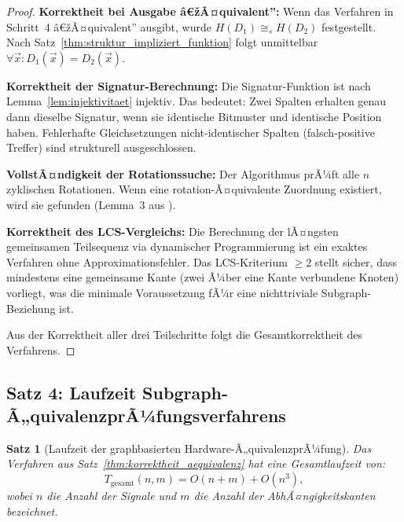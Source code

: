 ﻿\documentclass[12pt,a4paper]{report}
\newtheorem{theorem}{Satz}[section]
\begin{document}
\begin{proof}
\textbf{Korrektheit bei Ausgabe â€žÃ¤quivalent'':} Wenn das Verfahren in Schritt~4 â€žÃ¤quivalent'' ausgibt, wurde $H(D_1) \cong_s H(D_2)$ festgestellt. Nach Satz~\ref{thm:struktur_impliziert_funktion} folgt unmittelbar $\forall \vec{x} : D_1(\vec{x}) = D_2(\vec{x})$.

\textbf{Korrektheit der Signatur-Berechnung:} Die Signatur-Funktion ist nach Lemma~\ref{lem:injektivitaet} injektiv. Das bedeutet: Zwei Spalten erhalten genau dann dieselbe Signatur, wenn sie identische Bitmuster und identische Position haben. Fehlerhafte Gleichsetzungen nicht-identischer Spalten (falsch-positive Treffer) sind strukturell ausgeschlossen.

\textbf{VollstÃ¤ndigkeit der Rotationssuche:} Der Algorithmus prÃ¼ft alle $n$ zyklischen Rotationen. Wenn eine rotation-Ã¤quivalente Zuordnung existiert, wird sie gefunden (Lemma~3 aus \cite{subgraph2026}).

\textbf{Korrektheit des LCS-Vergleichs:} Die Berechnung der lÃ¤ngsten gemeinsamen Teilsequenz via dynamischer Programmierung ist ein exaktes Verfahren ohne Approximationsfehler. Das LCS-Kriterium $\geq 2$ stellt sicher, dass mindestens eine gemeinsame Kante (zwei Ã¼ber eine Kante verbundene Knoten) vorliegt, was die minimale Voraussetzung fÃ¼r eine nichttriviale Subgraph-Beziehung ist.

Aus der Korrektheit aller drei Teilschritte folgt die Gesamtkorrektheit des Verfahrens.
\end{proof}

\subsection{Satz 4: Laufzeit Subgraph-Ã„quivalenzprÃ¼fungsverfahrens}

\begin{theorem}[Laufzeit der graphbasierten Hardware-Ã„quivalenzprÃ¼fung]
\label{thm:laufzeit_aequivalenz}
Das Verfahren aus Satz~\ref{thm:korrektheit_aequivalenz} hat eine Gesamtlaufzeit von:
\[
T_{\mathrm{gesamt}}(n, m) = O(n + m) + O(n^3),
\]
wobei $n$ die Anzahl der Signale und $m$ die Anzahl der AbhÃ¤ngigkeitskanten bezeichnet.
\end{theorem}
\end{document}
